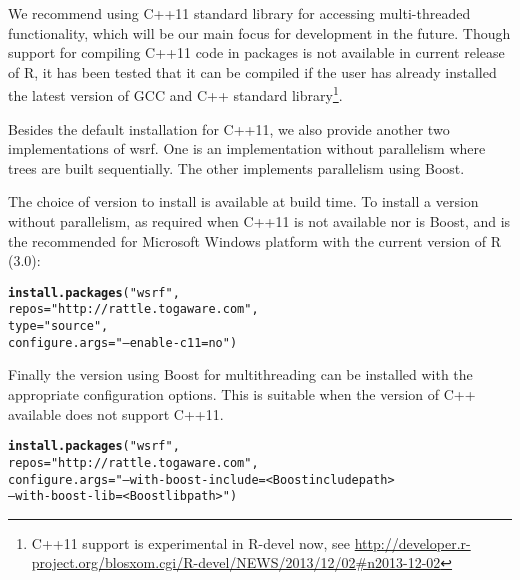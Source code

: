\documentclass[11pt,a4paper]{article}\usepackage{graphicx, color}
\makeatletter
\newcommand{\hlfunctioncall}[1]{\textcolor[rgb]{0.501960784313725,0,0.329411764705882}{\textbf{#1}}}%
\newcommand{\hlstring}[1]{\textcolor[rgb]{0.6,0.6,1}{#1}}%
\newenvironment{kframe}{%
 \def\at@end@of@kframe{}%
 \ifinner\ifhmode%
  \def\at@end@of@kframe{\end{minipage}}%
  \begin{minipage}{\columnwidth}%
 \fi\fi%
 \def\FrameCommand##1{\hskip\@totalleftmargin \hskip-\fboxsep
 \colorbox{shadecolor}{##1}\hskip-\fboxsep
     \hskip-\linewidth \hskip-\@totalleftmargin \hskip\columnwidth}%
 \MakeFramed {\advance\hsize-\width
   \@totalleftmargin\z@ \linewidth\hsize
   \@setminipage}}%
 {\par\unskip\endMakeFramed%
 \at@end@of@kframe}
\newenvironment{knitrout}{}{} %
\newcommand{\proglang}[1]{\textsf{#1}}
\newcommand{\pkg}[1]{{\fontseries{b}\selectfont #1}}
\makeatother
\begin{document}
We recommend using C++11 standard library for accessing multi-threaded
functionality, which will be our main focus for development in the
future.  Though support for compiling C++11 code in packages is not
available in current release of \proglang{R}, it has been tested that
it can be compiled if the user has already installed the latest
version of \proglang{GCC} and \proglang{C++} standard
library\footnote{\proglang{C++11} support is experimental in R-devel
  now, see
  \url{http://developer.r-project.org/blosxom.cgi/R-devel/NEWS/2013/12/02\#n2013-12-02}}.

Besides the default installation for \proglang{C++11}, we also provide
another two implementations of \pkg{wsrf}.  One is an implementation
without parallelism where trees are built sequentially.  The other
implements parallelism using Boost.

The choice of version to install is available at build time.  To
install a version without parallelism, as required when C++11 is not
available nor is Boost, and is the recommended for Microsoft Windows
platform with the current version of R (3.0):
\begin{knitrout}
\color{fgcolor}\begin{kframe}
\begin{alltt}
\hlfunctioncall{install.packages}(\hlstring{"wsrf"}, 
                 repos=\hlstring{"http://rattle.togaware.com"},
                 type=\hlstring{"source"}, 
                 configure.args=\hlstring{"--enable-c11=no"})
\end{alltt}
\end{kframe}
\end{knitrout}

Finally the version using Boost for multithreading can be installed
with the appropriate configuration options. This is suitable when the
version of C++ available does not support C++11.
\begin{knitrout}
\color{fgcolor}\begin{kframe}
\begin{alltt}
\hlfunctioncall{install.packages}(\hlstring{"wsrf"}, 
                 repos=\hlstring{"http://rattle.togaware.com"},
                 configure.args="--with-boost-include=<Boost include path>
                                 --with-boost-lib=<Boost lib path>")
\end{alltt}
\end{kframe}
\end{knitrout}
\end{document}

